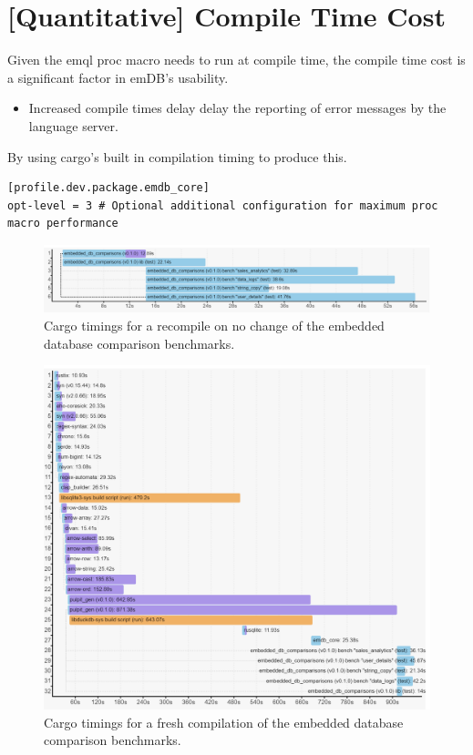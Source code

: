 \section{[Quantitative] Compile Time Cost}
Given the emql proc macro needs to run at compile time, the compile time cost is a significant factor in emDB's usability.
\begin{itemize}
    \setlength\itemsep{0em}
    \item Increased compile times delay delay the reporting of error messages by the language server.
\end{itemize}
By using cargo's built in compilation timing to produce this.
\begin{verbatim}
[profile.dev.package.emdb_core]
opt-level = 3 # Optional additional configuration for maximum proc macro performance
\end{verbatim}
\noindent
\begin{figure}[h!]
    \centering
    \includegraphics[width=\textwidth]{evaluation/images/recompile.png}
    \caption{Cargo timings for a recompile on no change of the embedded database comparison benchmarks.}
    \label{fig:recompile}
\end{figure}
\begin{figure}[h!]
    \centering
    \includegraphics[width=\textwidth]{evaluation/images/fresh.png}
    \caption{Cargo timings for a fresh compilation of the embedded database comparison benchmarks.}
    \label{fig:freshcompile}
\end{figure}
